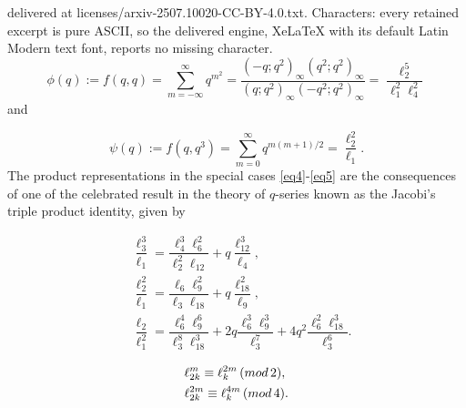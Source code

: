 \documentclass[10pt,a4paper]{amsart}
\renewcommand{\pmod}[1]{\,(\textup{mod}\,#1)}
\begin{document}
delivered at licenses/arxiv-2507.10020-CC-BY-4.0.txt. Characters: every retained excerpt is pure ASCII, so the delivered engine, XeLaTeX with its default Latin Modern text font, reports no missing character.
		\begin{equation}\label{eq4}
		\phi(q) := f(q,q) = \sum_{m={-}\infty}^{\infty}q^{{m}^2}=\frac{(-q;q^2)_\infty (q^2;q^2)_\infty}{(q;q^2)_\infty (-q^2;q^2)_\infty} = \frac{\ell_{2}^{5} }{{\ell_{1}^2}{\ell_{4}^2}} 
		\end{equation} and

		\begin{equation}\label{eq5}
		\psi(q) := f(q,q^3) = \sum_{m=0}^{\infty}q^{m(m+1)/2} = \frac{\ell_{2}^2}{\ell_{1}}.
		\end{equation}The product representations in the special cases \eqref{eq4}-\eqref{eq5} are the consequences of one of the celebrated result in the theory of $q$-series known as the Jacobi's triple product identity, given by

		\begin{align}
		\label{eq12}
		&\dfrac{\ell_3^3}{\ell_1} = \dfrac{\ell_{4}^3 \ell_6^2}{\ell_2^2 \ell_{12}} + q\dfrac{\ell_{12}^3}{\ell_4},\\
		\label{eq14}
		&\dfrac{\ell_2^2}{\ell_1} = \dfrac{\ell_6 \ell_9^2}{\ell_3 \ell_{18}} + q\dfrac{\ell_{18}^2}{\ell_9},\\
		\label{c18} 
		&\dfrac{\ell_2}{\ell_1^2}=\dfrac{\ell_6^4 \ell_9^6}{\ell_3^8 \ell_{18}^3}+2q\dfrac{\ell_6^3 \ell_9^3}{\ell_3^7}+4q^2\dfrac{\ell_6^2 \ell_{18}^3}{\ell_3^6}.
		\end{align}

\begin{align}\label{lm1}
&\ell_{2k}^{m} \equiv \ell_{k}^{2m}\pmod{2},\\
\label{lm2}
&\ell_{2k}^{2m} \equiv \ell_{k}^{4m}\pmod{4}.
\end{align}	 
\end{document}
